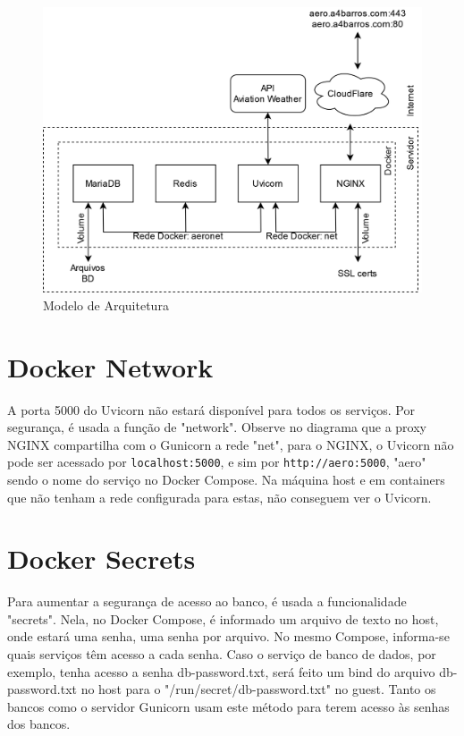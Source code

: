 \begin{figure}[ht]
    \begin{center}
    \includegraphics[width=\linewidth]{img/arquitetura.png}
    \caption{Modelo de Arquitetura}
    \label{fig:arquitetura}
    \end{center}
\end{figure}

\section{Docker Network}
A porta 5000 do Uvicorn não estará disponível para todos os serviços. Por segurança, é usada a função de
"network". Observe no diagrama que a proxy NGINX compartilha com o Gunicorn a rede "net", para o NGINX,
o Uvicorn não pode ser acessado por \texttt{localhost:5000}, e sim por \texttt{http://aero:5000}, "aero"
sendo o nome do serviço no Docker Compose. Na máquina host e em containers que não tenham a rede
configurada para estas, não conseguem ver o Uvicorn.


\section{Docker Secrets}

Para aumentar a segurança de acesso ao banco, é usada a funcionalidade "secrets". Nela, no Docker Compose,
é informado um arquivo de texto no host, onde estará uma senha, uma senha por arquivo. No mesmo Compose,
informa-se quais serviços têm acesso a cada senha. Caso o serviço de banco de dados, por exemplo, tenha
acesso a senha db-password.txt, será feito um bind do arquivo db-password.txt no host para o "/run/secret/db-password.txt"
no guest.
Tanto os bancos como o servidor Gunicorn usam este método para terem acesso às senhas dos bancos.

